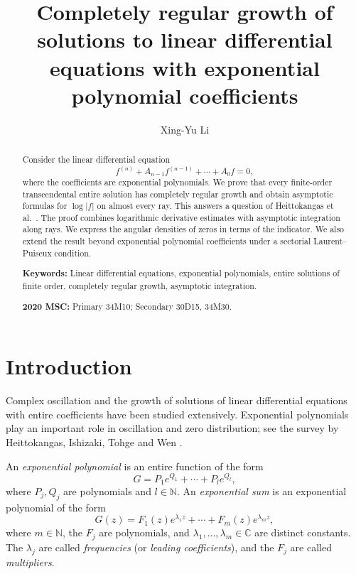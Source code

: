 \documentclass[a4paper,12pt]{article}
\title{\bf\Large Completely regular growth of solutions to linear differential equations with exponential polynomial coefficients}
\author{Xing-Yu Li}
\date{}
\newcommand{\C}{\mathbb{C}}
\numberwithin{equation}{section}
\begin{document}
	\maketitle
	
	\begin{abstract}
Consider the linear differential equation
\[
 f^{(n)}+A_{n-1}f^{(n-1)}+\cdots+A_0f=0,
\]
where the coefficients are exponential polynomials.
We prove that every finite-order transcendental entire solution has completely regular growth and obtain asymptotic formulas for \(\log |f|\) on almost every ray. This answers a question of Heittokangas et al.\ \cite[p.~33]{HITW2022}.
The proof combines logarithmic derivative estimates with asymptotic
integration along rays.
We express the angular densities of zeros in terms of the indicator.
We also extend the result beyond exponential polynomial coefficients under a sectorial Laurent–Puiseux condition.

\bigskip
\noindent
\textbf{Keywords:} Linear differential equations, exponential polynomials,
entire solutions of finite order, completely regular growth,
asymptotic integration.

\medskip
\noindent
\textbf{2020 MSC:} Primary 34M10; Secondary 30D15, 34M30.
\end{abstract}

\section{Introduction}
Complex oscillation and the growth of solutions of linear differential
equations with entire coefficients have been studied extensively.
Exponential polynomials play an important role in oscillation and
zero distribution; see the survey by
Heittokangas, Ishizaki, Tohge and Wen \cite{HITW2022}.

\bigskip
An \emph{exponential polynomial} is an entire function of the form
\begin{equation}\label{exppoly.eq1}
 G=P_1e^{Q_1}+\cdots+P_le^{Q_l},
\end{equation}
where $P_j,Q_j$ are polynomials and $l\in\mathbb N$.
An \emph{exponential sum} is an exponential polynomial of the form
\begin{equation}\label{expsum.eq}
	G(z)=F_1(z)e^{\lambda_1z}+\cdots+F_m(z)e^{\lambda_mz},
\end{equation}
where $m\in\mathbb N$, the $F_j$ are polynomials, and
$\lambda_1,\ldots,\lambda_m\in\C$ are distinct constants.
The $\lambda_j$ are called \emph{frequencies} (or \emph{leading coefficients}),
and the $F_j$ are called \emph{multipliers}.
\end{document}
